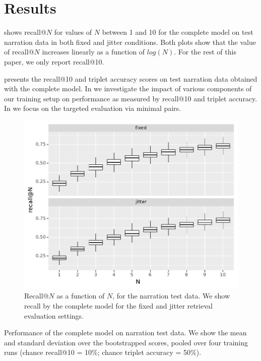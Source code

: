 \section{Results}
\label{sec:results}

 shows recall@$N$ for values of $N$
between 1 and 10 for the complete model on test narration data in both 
{\sc fixed} and {\sc jitter} conditions. Both plots show that the value of 
recall@$N$ increases linearly as a function of $log(N)$. For the rest 
of this paper, we only report recall@10.

 presents the recall@10 and triplet accuracy
scores on test narration data obtained with the complete
model. In  we investigate the impact
of various components of our training setup on performance as measured
by recall@10 and triplet accuracy.  In  we
focus on the targeted evaluation via minimal pairs.



\begin{figure}[htb]
  \centering
  \includegraphics[width=\columnwidth]{results/recall_at_1_to_n_test.pdf}
  \caption{Recall@$N$ as a function of $N$, for the narration test
    data. We show recall by the complete model for the {\sc fixed} and {\sc jitter}
    retrieval evaluation settings. }
  \label{fig:recall_at_1_to_n}
\end{figure}

\begin{table}[htb]
  
  \caption{Performance of the complete model on narration test
  	data. We show the mean and standard deviation over the
  	bootstrapped scores, pooled over four training runs
	(chance recall@10 = 10\%; chance triplet accuracy = 50\%).}
  \label{tab:test_scores}
\end{table}



